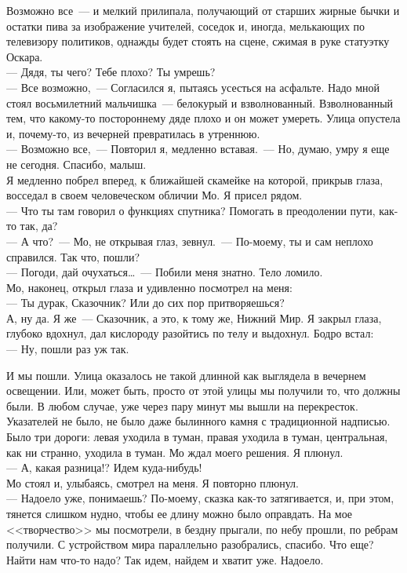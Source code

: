 Возможно все~--- и мелкий прилипала, получающий от старших жирные бычки и 
остатки пива за изображение учителей, соседок и, иногда, мелькающих по телевизору 
политиков, однажды будет стоять на сцене, сжимая в руке статуэтку Оскара.\\
--- Дядя, ты чего? Тебе плохо? Ты умрешь?\\
--- Все возможно,~--- Согласился я, пытаясь усесться на асфальте. Надо мной стоял 
восьмилетний мальчишка~--- белокурый и взволнованный. Взволнованный тем, что 
какому-то постороннему дяде плохо и он может умереть. Улица опустела и, 
почему-то, из вечерней превратилась в утреннюю.\\
--- Возможно все,~--- Повторил я, медленно вставая.~--- Но, думаю, умру я еще не 
сегодня. Спасибо, малыш.\\
Я медленно побрел вперед, к ближайшей скамейке на которой, прикрыв глаза, 
восседал в своем человеческом обличии Мо. Я присел рядом.\\
--- Что ты там говорил о функциях спутника? Помогать в преодолении пути, как-то 
так, да?\\
--- А что?~--- Мо, не открывая глаз, зевнул.~--- По-моему, ты и сам неплохо 
справился. Так что, пошли?\\
--- Погоди, дай очухаться\ldots~--- Побили меня знатно. Тело ломило.\\
Мо, наконец, открыл глаза и удивленно посмотрел на меня:\\
--- Ты дурак, Сказочник? Или до сих пор притворяешься?\\
А, ну да. Я же~--- Сказочник, а это, к тому же, Нижний Мир. Я закрыл глаза, 
глубоко вдохнул, дал кислороду разойтись по телу и выдохнул. Бодро встал:\\
--- Ну, пошли раз уж так.

И мы пошли. Улица оказалось не такой длинной как выглядела в вечернем 
освещении. Или, может быть, просто от этой улицы мы получили то, что должны были. В любом 
случае, уже через пару минут мы вышли на перекресток. Указателей не было, не 
было даже былинного камня с традиционной надписью. Было три дороги: левая 
уходила в туман, правая уходила в туман, центральная, как ни странно, уходила в 
туман. Мо ждал моего решения. Я плюнул.\\
--- А, какая разница!? Идем куда-нибудь!\\
Мо стоял и, улыбаясь, смотрел на меня. Я повторно плюнул.\\
--- Надоело уже, понимаешь? По-моему, сказка как-то затягивается, и, при этом, 
тянется слишком нудно, чтобы ее длину можно было оправдать. На мое 
<<творчество>> мы посмотрели, в бездну прыгали, по небу прошли, по ребрам получили. С 
устройством мира параллельно разобрались, спасибо. Что еще? Найти нам что-то 
надо? Так идем, найдем и хватит уже. Надоело.

